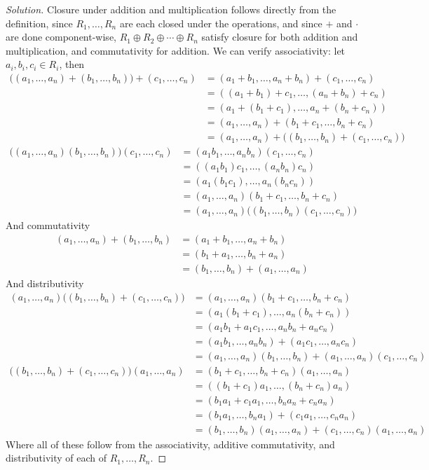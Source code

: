 \documentclass{article}
\begin{document}
\begin{proof}[Solution]\let\qed\relax
	Closure under addition and multiplication
	follows directly from the definition,
	since $R_1,\dots,R_n$ are each closed under the operations,
	and since $+$ and $\cdot$ are done component-wise,
	$R_1 \oplus R_2 \oplus \cdots \oplus R_n$ satisfy
	closure for both addition and multiplication,
	and commutativity for addition.
	We can verify associativity:
	let $a_i,b_i,c_i \in R_i$, then
	\begin{align*}
		\big((a_1,\dots,a_n) + (b_1,\dots,b_n)\big) + (c_1,\dots,c_n)
		&= (a_1 + b_1,\dots, a_n + b_n) + (c_1,\dots,c_n)\\
		&= ((a_1 + b_1) + c_1, \dots, (a_n + b_n) + c_n)\\
		&= (a_1 + (b_1 + c_1), \dots, a_n + (b_n + c_n))\\
		&= (a_1,\dots,a_n) + (b_1 + c_1, \dots, b_n + c_n)\\
		&= (a_1,\dots,a_n) + \big((b_1,\dots,b_n) + (c_1,\dots,c_n)\big)
	\end{align*}
	\begin{align*}
		\big((a_1,\dots,a_n) (b_1,\dots,b_n)\big)(c_1,\dots,c_n)
		&= (a_1b_1,\dots, a_nb_n)(c_1,\dots,c_n)\\
		&= ((a_1b_1)c_1, \dots, (a_nb_n)c_n)\\
		&= (a_1(b_1c_1), \dots, a_n(b_nc_n))\\
		&= (a_1,\dots,a_n)(b_1 + c_1, \dots, b_n + c_n)\\
		&= (a_1,\dots,a_n)\big((b_1,\dots,b_n)(c_1,\dots,c_n)\big)
	\end{align*}
	And commutativity
	\begin{align*}
		(a_1,\dots,a_n) + (b_1,\dots,b_n)
		&= (a_1 + b_1,\dots,a_n + b_n)\\
		&= (b_1 + a_1,\dots,b_n + a_n)\\
		&= (b_1,\dots,b_n) + (a_1,\dots,a_n)
	\end{align*}
	And distributivity
	\begin{align*}
		(a_1,\dots,a_n)\big((b_1,\dots,b_n) + (c_1,\dots,c_n)\big)
		&= (a_1,\dots,a_n)(b_1 + c_1,\dots,b_n + c_n)\\
		&= (a_1(b_1 + c_1),\dots,a_n(b_n + c_n))\\
		&= (a_1b_1 + a_1c_1,\dots,a_nb_n + a_nc_n)\\
		&= (a_1b_1, \dots, a_nb_n) + (a_1c_1,\dots,a_nc_n)\\
		&= (a_1,\dots,a_n)(b_1,\dots,b_n) + (a_1,\dots,a_n)(c_1,\dots,c_n)
	\end{align*}
	\begin{align*}
		\big((b_1,\dots,b_n) + (c_1,\dots,c_n)\big)(a_1,\dots,a_n)
		&= (b_1 + c_1,\dots,b_n + c_n)(a_1,\dots,a_n)\\
		&= ((b_1 + c_1)a_1,\dots,(b_n + c_n)a_n)\\
		&= (b_1a_1 + c_1a_1,\dots,b_na_n + c_na_n)\\
		&= (b_1a_1, \dots, b_na_1) + (c_1a_1,\dots,c_na_n)\\
		&= (b_1,\dots,b_n)(a_1,\dots,a_n) + (c_1,\dots,c_n)(a_1,\dots,a_n)
	\end{align*}
	Where all of these follow from the associativity,
	additive commutativity, and distributivity of each of $R_1,\dots,R_n$.


\end{proof}
\end{document}
